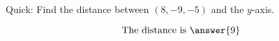 \documentclass{ximera}
\author{Bart Snapp}
\begin{document}
\begin{exercise}
  Quick: Find the distance between $(8,-9,-5)$ and the $y$-axis.
  \begin{prompt}
  \[
  \text{The distance is }\answer{9}
  \]
  \end{prompt}
\end{exercise}
\end{document}
